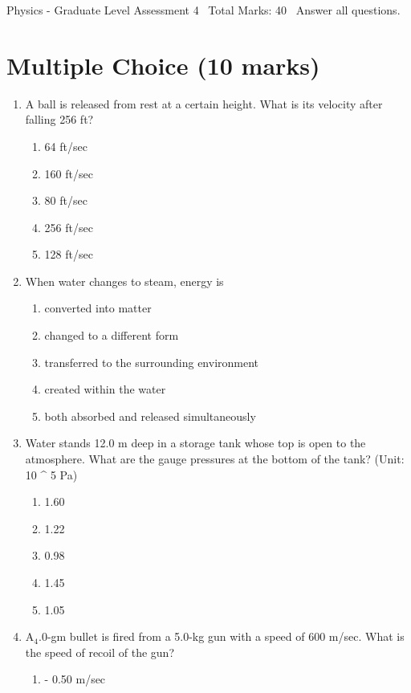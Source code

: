 \documentclass[12pt]{article}
\begin{document}
\begin{center}
Physics - Graduate Level Assessment 4 \
Total Marks: 40 \
Answer all questions.
\end{center}

\section*{Multiple Choice (10 marks)}
\begin{enumerate}[label=\arabic*.]
\item A ball is released from rest at a certain height. What is its velocity after falling 256 ft?
\begin{enumerate}[label=(\alph*)]
    \item 64 ft/sec
    \item 160 ft/sec
    \item 80 ft/sec
    \item 256 ft/sec
    \item 128 ft/sec
\end{enumerate}
\item When water changes to steam, energy is
\begin{enumerate}[label=(\alph*)]
    \item converted into matter
    \item changed to a different form
    \item transferred to the surrounding environment
    \item created within the water
    \item both absorbed and released simultaneously
\end{enumerate}
\item Water stands 12.0 m deep in a storage tank whose top is open to the atmosphere. What are the gauge pressures at the bottom of the tank? (Unit: 10 ^ 5 Pa)
\begin{enumerate}[label=(\alph*)]
    \item 1.60
    \item 1.22
    \item 0.98
    \item 1.45
    \item 1.05
\end{enumerate}
\item A$_{4}$.0-gm bullet is fired from a 5.0-kg gun with a speed of 600 m/sec. What is the speed of recoil of the gun?
\begin{enumerate}[label=(\alph*)]
    \item - 0.50 m/sec

\end{enumerate}
\end{enumerate}
\end{document}
